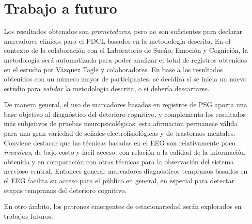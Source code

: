 \section{Trabajo a futuro}

Los resultados obtenidos son \textit{prometedores}, pero no son suficientes para declarar marcadores clínicos para el PDCL basados en la metodología descrita.
%
En el contexto de la colaboración con el Laboratorio de Sueño, Emoción y Cognición, la metodología será automatizada para poder analizar el total de registros obtenidos en el estudio por Vázquez Tagle y colaboradores.
%
En base a los resultados obtenidos con un número mayor de participantes, se decidirá si se inicia un nuevo estudio para \textit{validar} la metodología descrita, o si debería descartarse.

%
%

De manera general, el uso de marcadores basados en registros de PSG aporta una base objetivo al diagnóstico del deterioro cognitivo, y complementa los resultados más subjetivos de pruebas neuropsicológicas; esta afirmación permanece válida para una gran variedad de señales electrofisiológicas y de trastornos mentales.
%
Conviene destacar que las técnicas basadas en el EEG son relativamente poco \textit{invasivas}, de bajo costo y fácil acceso, con relación a la calidad de la información obtenida y en comparación con otras técnicas para la observación del sistema nervioso central.
%
Entonces generar marcadores diagnósticos tempranos basados en el EEG facilita su acceso para el público en general, en especial para detectar etapas tempranas del deterioro cognitivo.

En otro ámbito, los patrones emergentes de estacionariedad serán explorados en trabajos futuros.

